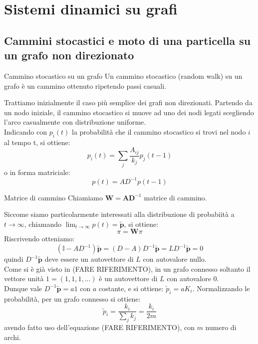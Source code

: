 \section{Sistemi dinamici su grafi}
\subsection{Cammini stocastici e moto di una particella su un grafo non direzionato}
\begin{boxb}{Cammino stocastico su un grafo}
Un cammino stocastico (random walk) su un grafo è un cammino ottenuto ripetendo passi casuali.
\end{boxb}
Trattiamo inizialmente il caso più semplice dei grafi non direzionati.
Partendo da un nodo iniziale, il cammino stocastico si muove ad uno dei nodi legati scegliendo l'arco casualmente con distribuzione uniforme.\\

Indicando con $p_i(t)$ la probabilità che il cammino stocastico si trovi nel nodo $i$ al tempo t, si ottiene:
\begin{equation}
    \boxed{p_i(t)=\sum_{j}^{}\frac{A_{ij}}{k_j}p_j(t-1)}
\end{equation}
o in forma matriciale:
\begin{equation}
    p(t)=AD^{-1}p(t-1)
\end{equation}
\begin{boxb}{Matrice di cammino}
Chiamiamo $\textbf{W}=\textbf{AD}^{-1}$ matrice di cammino.\\
\end{boxb}
Siccome siamo particolarmente interessati alla distribuzione di probabiità a $t \to \infty$, chiamando $\lim_{t \to \infty} p(t)=\mathbf{\tilde{p}}$, si ottiene:
\begin{equation}
    \pi=\textbf{W}\pi
\end{equation}
Riscrivendo otteniamo:
\begin{equation}
    (\mathbb{I}-AD^{-1})\mathbf{\tilde{p}}=(D-A)D^{-1}\mathbf{\tilde{p}}=LD^{-1}\mathbf{\tilde{p}}=0
\end{equation}
quindi $D^{-1}\mathbf{\tilde{p}}$ deve essere un autovettore di $L$ con autovalore nullo.\\

Come si è già visto in (FARE RIFERIMENTO), in un grafo connesso soltanto il vettore unità $\mathcal{1}=(1,1,1,...)$ è un autovettore di $L$ con autovalore $0$.\\
Dunque vale $D^{-1}\tilde{\mathbf{p}}=a\mathcal{1}$ con $a$ costante, e si ottiene: $\tilde{p}_i=aK_i$.
Normalizzando le probabilità, per un grafo connesso si ottiene:
\begin{equation}
    \boxed{\tilde{p}_i=\frac{k_i}{\sum_{j}^{}k_j}=\frac{k_i}{2m}}
\label{eq_stat_dis}
\end{equation}
avendo fatto uso dell'equazione (FARE RIFERIMENTO), con $m$ numero di archi.\\

